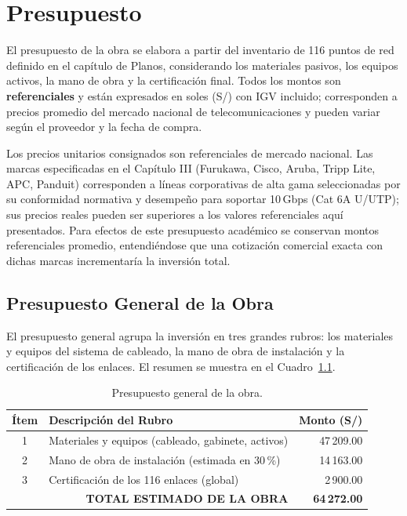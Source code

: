 \chapter{Presupuesto}

El presupuesto de la obra se elabora a partir del inventario de 116 puntos de red definido en el capítulo de Planos, considerando los materiales pasivos, los equipos activos, la mano de obra y la certificación final. Todos los montos son \textbf{referenciales} y están expresados en soles (S/) con IGV incluido; corresponden a precios promedio del mercado nacional de telecomunicaciones y pueden variar según el proveedor y la fecha de compra.

Los precios unitarios consignados son referenciales de mercado nacional. Las marcas especificadas en el Capítulo III (Furukawa, Cisco, Aruba, Tripp Lite, APC, Panduit) corresponden a líneas corporativas de alta gama seleccionadas por su conformidad normativa y desempeño para soportar 10\,Gbps (Cat 6A U/UTP); sus precios reales pueden ser superiores a los valores referenciales aquí presentados. Para efectos de este presupuesto académico se conservan montos referenciales promedio, entendiéndose que una cotización comercial exacta con dichas marcas incrementaría la inversión total.

\section{Presupuesto General de la Obra}
El presupuesto general agrupa la inversión en tres grandes rubros: los materiales y equipos del sistema de cableado, la mano de obra de instalación y la certificación de los enlaces. El resumen se muestra en el Cuadro~\ref{tab:presupuesto_general}.

\begin{table}[H]
\centering
\caption{Presupuesto general de la obra.}
\label{tab:presupuesto_general}
\begin{tabular}{clr}
\hline
\textbf{Ítem} & \textbf{Descripción del Rubro} & \textbf{Monto (S/)} \\
\hline
1 & Materiales y equipos (cableado, gabinete, activos) & 47\,209.00 \\
2 & Mano de obra de instalación (estimada en 30\,\%) & 14\,163.00 \\
3 & Certificación de los 116 enlaces (global) & 2\,900.00 \\
\hline
\multicolumn{2}{r}{\textbf{TOTAL ESTIMADO DE LA OBRA}} & \textbf{64\,272.00} \\
\hline
\end{tabular}
\end{table}

